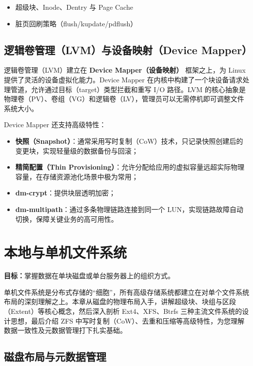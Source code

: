 \documentclass[12pt,UTF8]{ctexbook}
\begin{document}
	
\begin{itemize}
		\item 超级块、Inode、Dentry 与 Page Cache
		\item 脏页回刷策略（flush/kupdate/pdflush）
\end{itemize}
	
\section{逻辑卷管理（LVM）与设备映射（Device Mapper）}
	
	逻辑卷管理（LVM）建立在 \textbf{Device Mapper（设备映射）} 框架之上，为 Linux 提供了灵活的设备虚拟化能力。Device Mapper 在内核中构建了一个块设备请求处理管道，允许通过目标（target）类型拦截和重写 I/O 路径。LVM 的核心抽象是物理卷（PV）、卷组（VG）和逻辑卷（LV），管理员可以无需停机即可调整文件系统大小。
	
	Device Mapper 还支持高级特性：
	\begin{itemize}
		\item \textbf{快照（Snapshot）}：通常采用写时复制（CoW）技术，只记录快照创建后的变更块，实现轻量级的数据备份与回滚；
		\item \textbf{精简配置（Thin Provisioning）}：允许分配给应用的虚拟容量远超实际物理容量，在存储资源池化场景中极为常用；
		\item \textbf{dm-crypt}：提供块层透明加密；
		\item \textbf{dm-multipath}：通过多条物理链路连接到同一个 LUN，实现链路故障自动切换，保障关键业务的高可用性。
	\end{itemize}
	
	\chapter{本地与单机文件系统}
	\textbf{目标：}掌握数据在单块磁盘或单台服务器上的组织方式。
	
	单机文件系统是分布式存储的“细胞”，所有高级存储系统都建立在对单个文件系统布局的深刻理解之上。本章从磁盘的物理布局入手，讲解超级块、块组与区段（Extent）等核心概念，然后深入剖析 Ext4、XFS、Btrfs 三种主流文件系统的设计思想，最后介绍 ZFS 中写时复制（CoW）、去重和压缩等高级特性，为您理解数据一致性及元数据管理打下扎实基础。
	
	\section{磁盘布局与元数据管理}
	
\end{document}
